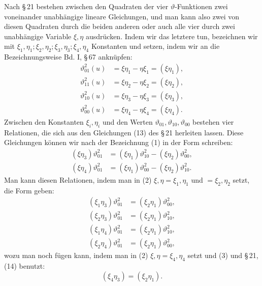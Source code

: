 \documentclass[11pt]{article}
\providecommand{\tht}{\vartheta}
\begin{document}
Nach \S\,21 bestehen zwischen den Quadraten der vier $\vartheta$-Funktionen zwei voneinander unabhängige lineare Gleichungen, und man kann also zwei von diesen Quadraten durch die beiden anderen oder auch alle vier durch zwei unabhängige Variable $\xi,\eta$ ausdrücken. Indem wir das letztere tun, bezeichnen wir mit $\xi_1,\eta_1;\xi_2,\eta_2;\xi_3,\eta_3;\xi_4,\eta_4$ Konstanten und setzen, indem wir an die Bezeichnungsweise Bd. I, \S\,67 anknüpfen:
\begin{equation}
\begin{aligned}
\tht_{01}^{2}(u)&=\xi\eta_1-\eta\xi_1=(\xi\eta_1),\\
\tht_{11}^{2}(u)&=\xi\eta_2-\eta\xi_2=(\xi\eta_2),\\
\tht_{10}^{2}(u)&=\xi\eta_3-\eta\xi_3=(\xi\eta_3),\\
\tht_{00}^{2}(u)&=\xi\eta_4-\eta\xi_4=(\xi\eta_4).
\end{aligned}
\tag{1}
\end{equation}
Zwischen den Konstanten $\xi_i,\eta_i$ und den Werten $\vartheta_{01},\vartheta_{10},\vartheta_{00}$ bestehen vier Relationen, die sich aus den Gleichungen (13) des \S\,21 herleiten lassen. Diese Gleichungen können wir nach der Bezeichnung (1) in der Form schreiben:
\begin{equation}
\begin{aligned}
(\xi\eta_3)\tht_{01}^{2}&=(\xi\eta_1)\tht_{10}^{2}-(\xi\eta_2)\tht_{00}^{2},\\
(\xi\eta_4)\tht_{01}^{2}&=(\xi\eta_1)\tht_{00}^{2}-(\xi\eta_2)\tht_{10}^{2}.
\end{aligned}
\tag{2}
\end{equation}
Man kann diesen Relationen, indem man in (2) $\xi,\eta=\xi_1,\eta_1$ und $=\xi_2,\eta_2$ setzt, die Form geben:
\begin{equation}
\begin{aligned}
(\xi_1\eta_3)\tht_{01}^{2}&=(\xi_2\eta_1)\tht_{00}^{2},\\
(\xi_2\eta_3)\tht_{01}^{2}&=(\xi_2\eta_1)\tht_{10}^{2},\\
(\xi_1\eta_4)\tht_{01}^{2}&=(\xi_2\eta_1)\tht_{10}^{2},\\
(\xi_2\eta_4)\tht_{01}^{2}&=(\xi_2\eta_1)\tht_{00}^{2},
\end{aligned}
\tag{3}
\end{equation}
wozu man noch fügen kann, indem man in (2) $\xi,\eta=\xi_4,\eta_4$ setzt und (3) und \S\,21, (14) benutzt:
\begin{equation}
(\xi_4\eta_3)=(\xi_2\eta_1).
\tag{4}
\end{equation}
\end{document}
